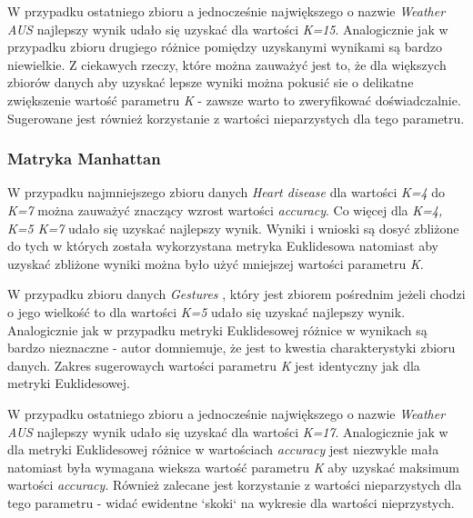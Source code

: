 \documentclass{classrep}
\begin{document}
{{{                W przypadku ostatniego zbioru a jednocześnie największego o nazwie
                \textit{Weather AUS} \cite{dataset_weather_aus} najlepszy wynik udało się
                uzyskać dla wartości \textit{K=15}. Analogicznie jak w przypadku zbioru
                drugiego \cite{dataset_gestures} różnice pomiędzy uzyskanymi wynikami są
                bardzo niewielkie. Z ciekawych rzeczy, które można zauważyć jest to, że dla
                większych zbiorów danych aby uzyskać lepsze wyniki można pokusić sie o
                delikatne zwiększenie wartość parametru \textit{K} - zawsze warto to
                zweryfikować doświadczalnie. Sugerowane jest również korzystanie z
                wartości nieparzystych dla tego parametru.
            }

            \subsubsection{Matryka Manhattan}
            \label{knn_summary_manh} {

                W przypadku najmniejszego zbioru danych \textit{Heart disease}
                \cite{dataset_heart} dla wartości \textit{K=4} do \textit{K=7} można
                zauważyć znaczący wzrost wartości \textit{accuracy}. Co więcej
                dla \textit{K=4, K=5 K=7} udało się uzyskać najlepszy wynik. Wyniki i
                wnioski są dosyć zbliżone do tych w których została wykorzystana
                metryka Euklidesowa natomiast aby uzyskać zbliżone wyniki można było
                użyć mniejszej wartości parametru \textit{K}.

                W przypadku zbioru danych \textit{Gestures} \cite{dataset_gestures}, który
                jest zbiorem pośrednim jeżeli chodzi o jego wielkość to dla wartości
                \textit{K=5} udało się uzyskać najlepszy wynik. Analogicznie jak w
                przypadku metryki Euklidesowej różnice w wynikach są bardzo nieznaczne
                - autor domniemuje, że jest to kwestia charakterystyki zbioru danych.
                Zakres sugerowaych wartości parametru \textit{K} jest identyczny jak dla
                metryki Euklidesowej.

                W przypadku ostatniego zbioru a jednocześnie największego o nazwie
                \textit{Weather AUS} \cite{dataset_weather_aus} najlepszy wynik udało się
                uzyskać dla wartości \textit{K=17}. Analogicznie jak w dla metryki
                Euklidesowej różnice w wartościach \textit{accuracy} jest niezwykle
                mała natomiast była wymagana wieksza wartość parametru \textit{K} aby
                uzyskać maksimum wartości \textit{accuracy}. Również zalecane jest 
                korzystanie z wartości nieparzystych dla tego parametru - widać 
                ewidentne `skoki` na wykresie dla wartości nieprzystych.
            }
        }

}
\end{document}
